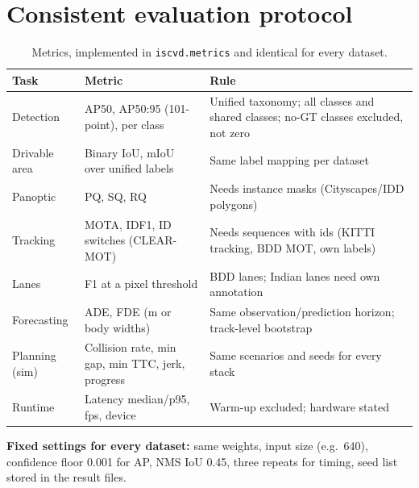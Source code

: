 \documentclass[11pt,a4paper]{article}
\begin{document}
\section{Consistent evaluation protocol}
\begin{table}[h]
\centering\small
\caption{Metrics, implemented in \texttt{iscvd.metrics} and identical for every dataset.}
\begin{tabular}{@{}p{3.0cm}p{5.6cm}p{5.5cm}@{}}
\toprule
Task & Metric & Rule \\
\midrule
Detection & AP50, AP50:95 (101-point), per class & Unified taxonomy; all classes and shared classes; no-GT classes excluded, not zero \\
Drivable area & Binary IoU, mIoU over unified labels & Same label mapping per dataset \\
Panoptic & PQ, SQ, RQ & Needs instance masks (Cityscapes/IDD polygons) \\
Tracking & MOTA, IDF1, ID switches (CLEAR-MOT) & Needs sequences with ids (KITTI tracking, BDD MOT, own labels) \\
Lanes & F1 at a pixel threshold & BDD lanes; Indian lanes need own annotation \\
Forecasting & ADE, FDE (m or body widths) & Same observation/prediction horizon; track-level bootstrap \\
Planning (sim) & Collision rate, min gap, min TTC, jerk, progress & Same scenarios and seeds for every stack \\
Runtime & Latency median/p95, fps, device & Warm-up excluded; hardware stated \\
\bottomrule
\end{tabular}
\end{table}
\textbf{Fixed settings for every dataset:} same weights, input size (e.g.\ 640), confidence floor 0.001 for AP, NMS IoU 0.45, three repeats for timing, seed list stored in the result files.
\end{document}
